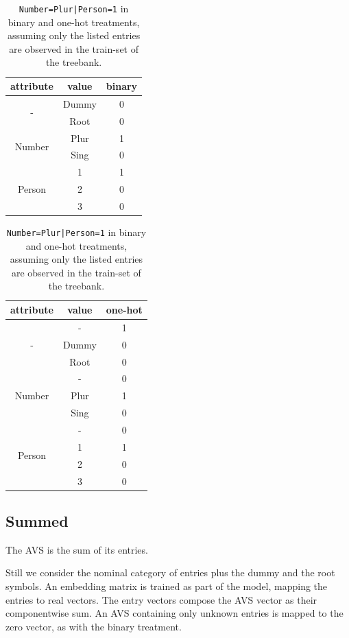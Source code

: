 \documentclass[11pt]{article}
\begin{document}
\begin{table}[htb!]
  \centering
  {\ttfamily\small
    \begin{tabular}{ccc}
      attribute &value &binary\\
      \midrule
      \multirow{2}{*}{-} &Dummy &0\\
                &Root &0\\
      \midrule[0pt]
      \multirow{2}{*}{Number} &Plur &1\\
                &Sing &0\\
      \midrule[0pt]
      \multirow{3}{*}{Person} &1 &1\\
                &2 &0\\
                &3 &0\\
    \end{tabular}
    \hfil
    \begin{tabular}{ccc}
      attribute &value &one-hot\\
      \midrule
      \multirow{3}{*}{-} &- &1\\
                &Dummy &0\\
                &Root &0\\
      \midrule[0pt]
      \multirow{3}{*}{Number} &- &0\\
                &Plur &1\\
                &Sing &0\\
      \midrule[0pt]
      \multirow{4}{*}{Person} &- &0\\
                &1 &1\\
                &2 &0\\
                &3 &0\\
    \end{tabular}}
  \caption[]{\label{tab:encoding}\texttt{Number=Plur|Person=1} in binary and one-hot treatments,
    assuming only the listed entries are observed in the train-set of the treebank.}
\end{table}

\subsection*{Summed}

The AVS is the sum of its entries.

Still we consider the nominal category of entries plus the dummy and the root symbols.
An embedding matrix is trained as part of the model, mapping the entries to real vectors.
The entry vectors compose the AVS vector as their componentwise sum.
An AVS containing only unknown entries is mapped to the zero vector, as with the binary treatment.
\end{document}
